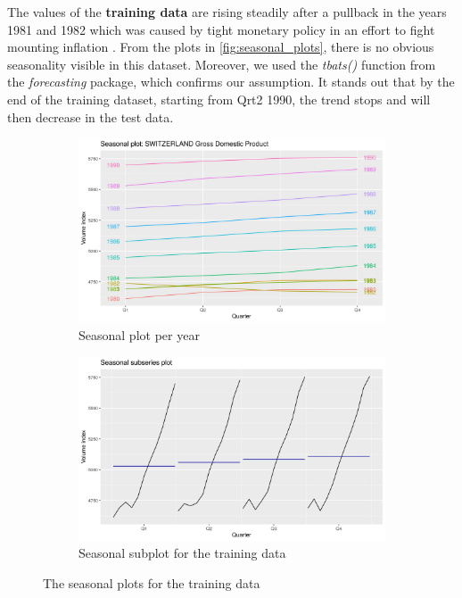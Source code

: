 \documentclass[10pt]{article}
\begin{document}
\noindent The values of the \textbf{training data} are rising steadily after a pullback in the years 1981 and 1982 which was caused by tight monetary policy in an effort to fight mounting inflation \autocite{Sablik_undated-bb}. From the plots in \autoref{fig:seasonal_plots}, there is no obvious seasonality visible in this dataset. Moreover, we used the \textit{tbats()} \autocite{Hyndman2013-za} function from the \textit{forecasting} package, which confirms our assumption. It stands out that by the end of the training dataset, starting from Qrt2 1990, the trend stops and will then decrease in the test data.

\begin{figure}[ht!]
\centering
\begin{subfigure}{.5\textwidth}
  \centering
  \includegraphics[width=1\linewidth]{img/seasonal.jpeg}
  \caption{Seasonal plot per year}
  \label{fig:seasonal_plot_per_year}
\end{subfigure}%
\begin{subfigure}{.5\textwidth}
  \centering
  \includegraphics[width=1\linewidth]{img/subseriesplot.jpeg}
  \caption{Seasonal subplot for the training data}
  \label{fig:seasonal_sub_plot}
\end{subfigure}
\caption{The seasonal plots for the training data}
\label{fig:seasonal_plots}
\end{figure}
\end{document}
